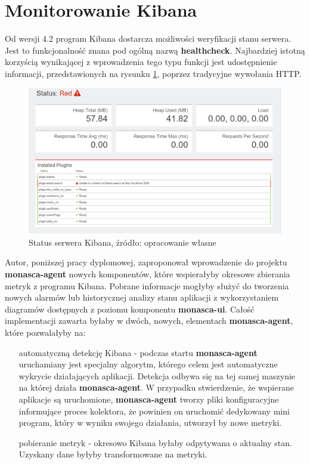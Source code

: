 \section{Monitorowanie Kibana}
\label{chapter:application_own:plans:monitoring_kibana}

Od wersji 4.2 program Kibana dostarcza możliwości weryfikacji stanu serwera. Jest to funkcjonalność znana pod ogólną nazwą
\textbf{healthcheck}. Najbardziej istotną korzyścią wynikającej z wprowadzenia tego typu funkcji jest 
udostępnienie informacji, przedstawionych na rysunku \ref{chapter:application_own:plans:monitoring_kibana:picture},
poprzez tradycyjne wywołania HTTP. 

\begin{figure}[H]
    \centering
    \includegraphics[width=1.0\textwidth]{images/kibana_status}
    \caption[Status serwera Kibana]{
        Status serwera Kibana, źródło: opracowanie własne
    }
    \label{chapter:application_own:plans:monitoring_kibana:picture}
\end{figure}

Autor, poniższej pracy dyplomowej, zaproponował wprowadzenie do projektu \textbf{monasca-agent} nowych komponentów, które
wspierałyby okresowe zbierania metryk z programu Kibana. Pobrane informacje mogłyby służyć do tworzenia
nowych alarmów lub historycznej analizy stanu aplikacji z wykorzystaniem diagramów dostępnych z poziomu komponentu 
\textbf{monasca-ui}. Całość implementacji zawarta byłaby w dwóch, nowych, elementach \textbf{monasca-agent}, które
pozwalałyby na:
\begin{itemize}
    \item[automatyczną detekcję Kibana] - podczas startu \textbf{monasca-agent} uruchamiany jest specjalny algorytm, którego
    celem jest automatyczne wykrycie działających aplikacji. Detekcja odbywa się na tej samej maszynie na której działa 
    \textbf{monasca-agent}. W przypadku stwierdzenie, że wspierane aplikacje są uruchomione, \textbf{monasca-agent} tworzy 
    pliki konfiguracyjne informujące proces kolektora, że powinien on uruchomić dedykowany mini program, który w wyniku
    swojego działania, utworzył by nowe metryki.
    \item[pobieranie metryk] - okresowo Kibana byłaby odpytywana o aktualny stan. Uzyskany dane byłyby transformowane
    na metryki.
\end{itemize}